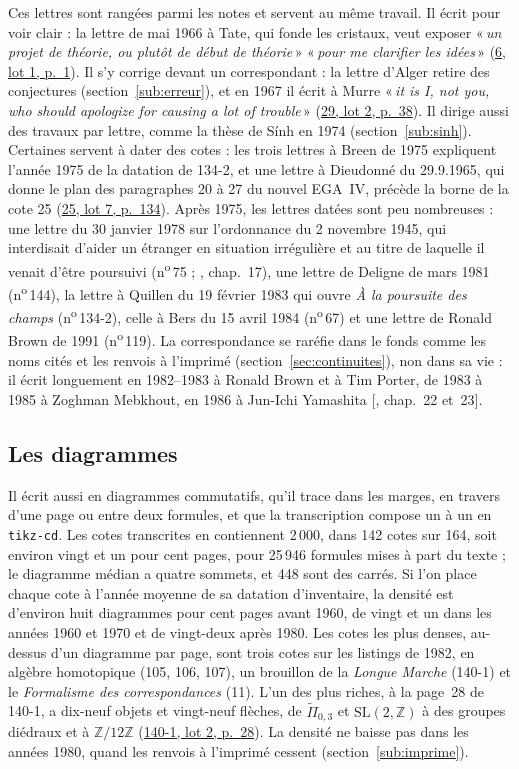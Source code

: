 \documentclass[11pt]{amsart}
\makeatletter
\newcommand{\q}[1]{«\,\textit{#1}\,»}
\newcommand{\cote}[1]{\mbox{n\textsuperscript{o}\,#1}}
\def\RHM@first#1--#2\@nil{#1}
\DeclareRobustCommand{\lot}[3]{\begingroup\edef\RHM@pdfpage{\the\numexpr\RHM@first#3--\@nil+1\relax}\href{https://grothendieck.umontpellier.fr/#1.pdf\#page=\RHM@pdfpage}{#1, lot #2, p.~#3}\endgroup}
\newcommand{\lot}[3]{\href{https://grothendieck.commutator.io/\##1/#2/p#3}{#1, lot #2, p.~#3}}
\makeatother
\begin{document}
Ces lettres sont rangées parmi les notes et servent au même travail. Il écrit pour voir clair : la lettre de mai 1966 à Tate, qui fonde les cristaux, veut exposer \q{un projet de théorie, ou plutôt de début de théorie} \q{pour me clarifier les idées} (\lot{6}{1}{1}). Il s'y corrige devant un correspondant : la lettre d'Alger retire des conjectures (section~\ref{sub:erreur}), et en 1967 il écrit à Murre \q{it is I, not you, who should apologize for causing a lot of trouble} (\lot{29}{2}{38}). Il dirige aussi des travaux par lettre, comme la thèse de Sính en 1974 (section~\ref{sub:sinh}). Certaines servent à dater des cotes : les trois lettres à Breen de 1975 expliquent l'année 1975 de la datation de 134-2, et une lettre à Dieudonné du 29.9.1965, qui donne le plan des paragraphes 20 à 27 du nouvel EGA~IV, précède la borne de la cote 25 (\lot{25}{7}{134}). Après 1975, les lettres datées sont peu nombreuses : une lettre du 30 janvier 1978 sur l'ordonnance du 2 novembre 1945, qui interdisait d'aider un étranger en situation irrégulière et au titre de laquelle il venait d'être poursuivi (\cote{75} ; \citealp{circle-spirit}, chap.~17), une lettre de Deligne de mars 1981 (\cote{144}), la lettre à Quillen du 19 février 1983 qui ouvre \emph{À la poursuite des champs} (\cote{134-2}), celle à Bers du 15 avril 1984 (\cote{67}) et une lettre de Ronald Brown de 1991 (\cote{119}). La correspondance se raréfie dans le fonds comme les noms cités et les renvois à l'imprimé (section~\ref{sec:continuites}), non dans sa vie : il écrit longuement en 1982--1983 à Ronald Brown et à Tim Porter, de 1983 à 1985 à Zoghman Mebkhout, en 1986 à Jun-Ichi Yamashita [\citealp{circle-spirit}, chap.~22 et~23].

\subsection{Les diagrammes}

Il écrit aussi en diagrammes commutatifs, qu'il trace dans les marges, en travers d'une page ou entre deux formules, et que la transcription compose un à un en \texttt{tikz-cd}. Les cotes transcrites en contiennent 2\,000, dans 142 cotes sur 164, soit environ vingt et un pour cent pages, pour 25\,946 formules mises à part du texte ; le diagramme médian a quatre sommets, et 448 sont des carrés. Si l'on place chaque cote à l'année moyenne de sa datation d'inventaire, la densité est d'environ huit diagrammes pour cent pages avant 1960, de vingt et un dans les années 1960 et 1970 et de vingt-deux après 1980. Les cotes les plus denses, au-dessus d'un diagramme par page, sont trois cotes sur les listings de 1982, en algèbre homotopique (105, 106, 107), un brouillon de la \emph{Longue Marche} (140-1) et le \emph{Formalisme des correspondances} (11). L'un des plus riches, à la page~28 de 140-1, a dix-neuf objets et vingt-neuf flèches, de $\widetilde{\Pi}_{0,3}$ et $\mathrm{SL}(2,\mathbb{Z})$ à des groupes diédraux et à $\mathbb{Z}/12\mathbb{Z}$ (\lot{140-1}{2}{28}). La densité ne baisse pas dans les années 1980, quand les renvois à l'imprimé cessent (section~\ref{sub:imprime}).
\end{document}
